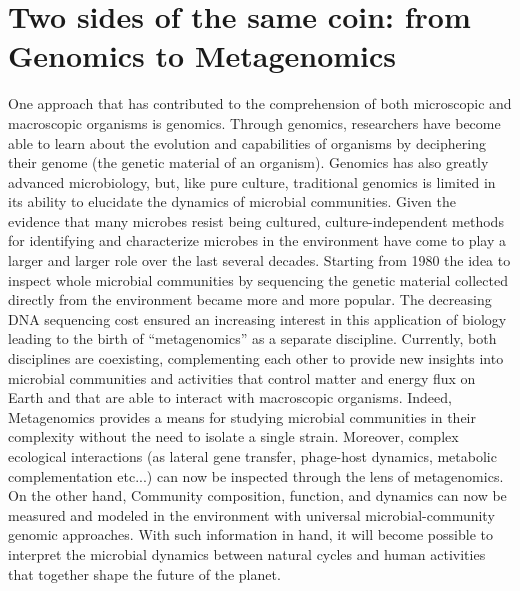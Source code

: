 \section{Two sides of the same coin: from Genomics to Metagenomics}
One approach that has contributed to the comprehension of both microscopic and macroscopic organisms is genomics. Through genomics, researchers have become able to learn about the evolution and capabilities of organisms by deciphering their genome (the genetic material of an organism). Genomics has also greatly advanced microbiology, but, like pure culture, traditional genomics is limited in its ability to elucidate the dynamics of microbial communities. Given the evidence that many microbes resist being cultured, culture-independent methods for identifying and characterize microbes in the environment have come to play a larger and larger role over the last several decades. Starting from 1980 the idea to inspect whole microbial communities by sequencing the genetic material collected directly from the environment became more and more popular. The decreasing DNA sequencing cost ensured an increasing interest in this application of biology leading to the birth of ``metagenomics'' as a separate discipline. Currently, both disciplines are coexisting, complementing each other to provide new insights into microbial communities and activities that control matter and energy flux on Earth and that are able to interact with macroscopic organisms. Indeed, Metagenomics provides a means for studying microbial communities in their complexity without the need to isolate a single strain. Moreover, complex ecological interactions (as lateral gene transfer, phage-host dynamics, metabolic complementation etc...) can now be inspected through the lens of metagenomics. On the other hand, Community composition, function, and dynamics can now be measured and modeled in the environment with universal microbial-community genomic approaches. With such information in hand, it will become possible to interpret the microbial dynamics between natural cycles and human activities that together shape the future of the planet.\\

